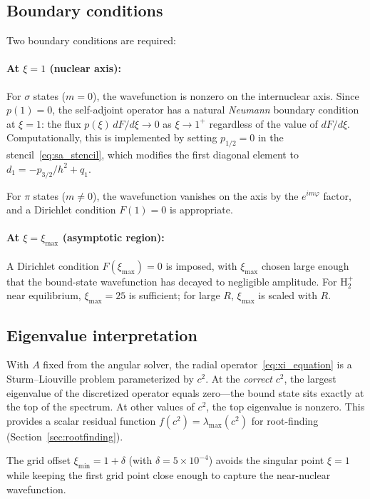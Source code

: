 \documentclass[aps,pra,twocolumn,superscriptaddress,longbibliography]{revtex4-2}
\begin{document}
\subsection{Boundary conditions}

Two boundary conditions are required:

\paragraph{At $\xi = 1$ (nuclear axis):}
For $\sigma$ states ($m = 0$), the wavefunction is nonzero on the
internuclear axis.  Since $p(1) = 0$, the self-adjoint operator has
a natural \emph{Neumann} boundary condition at $\xi = 1$: the flux
$p(\xi)\,dF/d\xi \to 0$ as $\xi \to 1^+$ regardless of the value
of $dF/d\xi$.  Computationally, this is implemented by setting
$p_{1/2} = 0$ in the stencil~\eqref{eq:sa_stencil}, which modifies
the first diagonal element to $d_1 = -p_{3/2}/h^2 + q_1$.

For $\pi$ states ($m \neq 0$), the wavefunction vanishes on the axis
by the $e^{im\varphi}$ factor, and a Dirichlet condition $F(1) = 0$
is appropriate.

\paragraph{At $\xi = \xi_{\max}$ (asymptotic region):}
A Dirichlet condition $F(\xi_{\max}) = 0$ is imposed, with
$\xi_{\max}$ chosen large enough that the bound-state wavefunction
has decayed to negligible amplitude.  For H$_2^+$ near equilibrium,
$\xi_{\max} = 25$ is sufficient; for large $R$, $\xi_{\max}$ is
scaled with $R$.

\subsection{Eigenvalue interpretation}

With $A$ fixed from the angular solver, the radial
operator~\eqref{eq:xi_equation} is a Sturm--Liouville problem
parameterized by $c^2$.  At the \emph{correct} $c^2$, the largest
eigenvalue of the discretized operator equals zero---the bound state
sits exactly at the top of the spectrum.  At other values of $c^2$,
the top eigenvalue is nonzero.  This provides a scalar residual
function $f(c^2) = \lambda_{\max}(c^2)$ for root-finding
(Section~\ref{sec:rootfinding}).

The grid offset $\xi_{\min} = 1 + \delta$ (with $\delta = 5 \times
10^{-4}$) avoids the singular point $\xi = 1$ while keeping the
first grid point close enough to capture the near-nuclear wavefunction.
\end{document}
